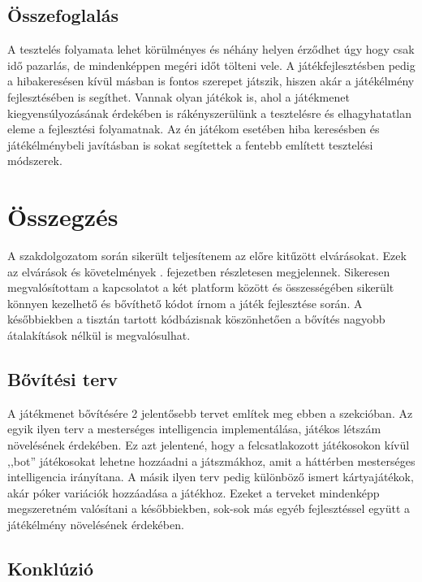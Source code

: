 \documentclass[]{thesis-ekf}
\theoremstyle{definition}
\theoremstyle{remark}
\begin{document}
\section{Összefoglalás}

A tesztelés folyamata lehet körülményes és néhány helyen érződhet úgy hogy csak idő pazarlás, de mindenképpen megéri időt tölteni vele. A játékfejlesztésben pedig a hibakeresésen kívül másban is fontos szerepet játszik, hiszen akár a játékélmény fejlesztésében is segíthet. Vannak olyan játékok is, ahol a játékmenet kiegyensúlyozásának érdekében is rákényszerülünk a tesztelésre és elhagyhatatlan eleme a fejlesztési folyamatnak. Az én játékom esetében hiba keresésben és játékélménybeli javításban is sokat segítettek a fentebb említett tesztelési módszerek.

\chapter*{Összegzés}

A szakdolgozatom során sikerült teljesítenem az előre kitűzött elvárásokat. Ezek az elvárások és követelmények . fejezetben részletesen megjelennek. Sikeresen megvalósítottam a kapcsolatot a két platform között és összességében sikerült könnyen kezelhető és bővíthető kódot írnom a játék fejlesztése során. A későbbiekben a tisztán tartott kódbázisnak köszönhetően a bővítés nagyobb átalakítások nélkül is megvalósulhat.

\section{Bővítési terv}

A játékmenet bővítésére 2 jelentősebb tervet említek meg ebben a szekcióban. Az egyik ilyen terv a mesterséges intelligencia implementálása, játékos létszám növelésének érdekében. Ez azt jelentené, hogy a felcsatlakozott játékosokon kívül ,,bot'' játékosokat lehetne hozzáadni a játszmákhoz, amit a háttérben mesterséges intelligencia irányítana. A másik ilyen terv pedig különböző ismert kártyajátékok, akár póker variációk hozzáadása a játékhoz. Ezeket a terveket mindenképp megszeretném valósítani a későbbiekben, sok-sok más egyéb fejlesztéssel együtt a játékélmény növelésének érdekében.

\section{Konklúzió}
\end{document}
